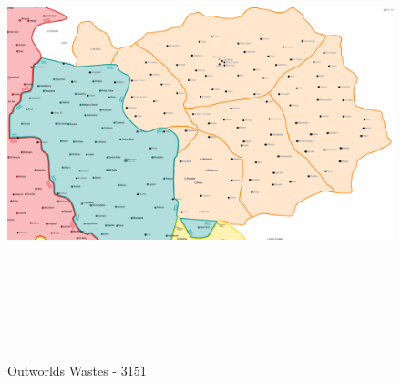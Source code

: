 \begin{figure}[!h]
  \centering
  \includegraphics[width=8.9in,height=5.36in]{img/Outworlds_Wastes_ilClan_Map.png}
  \caption*{Outworlds Wastes - 3151}
\end{figure}
